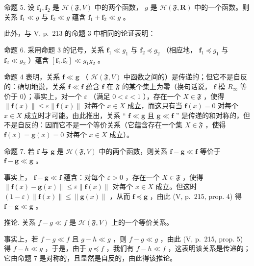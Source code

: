 命题 5. 设 \(\mathbf{f}_1, \mathbf{f}_2\) 是 \(\mathcal{H}(\mathfrak{F}, V)\) 中的两个函数， \(g\) 是 \(\mathcal{H}(\mathfrak{F}, \mathbf{R})\) 中的一个函数。则关系 \(\mathbf{f}_1 \ll g\) 与 \(\mathbf{f}_2 \ll g\) 蕴含 \(\mathbf{f}_1 + \mathbf{f}_2 \ll g\) 。

此外，与 V, p.~213 的命题 3 中相同的论证表明：

命题 6. 采用命题 3 的记号，关系 \(\mathbf{f}_1 \ll g_1\) 与 \(\mathbf{f}_2 \preccurlyeq g_2\) （相应地， \(\mathbf{f}_1 \preccurlyeq g_1\) 与 \(\mathbf{f}_2 \ll g_2\) ）蕴含 \([\mathbf{f}_1.\mathbf{f}_2] \ll g_1g_2\) 。

命题 4 表明，关系 \(\mathbf{f} \ll \mathbf{g}\) （ \(\mathcal{H}(\mathfrak{F}, V)\) 中函数之间的）是传递的；但它不是自反的：确切地说，关系 \(\mathbf{f} \ll \mathbf{f}\) 蕴含 \(\mathbf{f}\) 在 \(\mathfrak{F}\) 的某个集上为零（换句话说， \(\mathbf{f}\) 模 \(R_{\infty}\) 等价于 0）；事实上，对一个 \(\varepsilon\) （满足 \(0 < \varepsilon < 1\) ），存在一个 \(X \in \mathfrak{F}\) ，使得 \(\| \mathbf{f}(x) \| \leqslant \varepsilon \| \mathbf{f}(x) \|\) 对每个 \(x \in X\) 成立，而这只有当 \(\mathbf{f}(x) = 0\) 对每个 \(x \in X\) 成立时才可能。由此推出，关系 “ \(\mathbf{f} \ll \mathbf{g}\) 且 \(\mathbf{g} \ll \mathbf{f}\) ” 是传递的和对称的，但不是自反的：因而它不是一个等价关系（它蕴含存在一个集 \(X \in \mathfrak{F}\) ，使得 \(\mathbf{f}(x) = \mathbf{g}(x) = 0\) 对每个 \(x \in X\) 成立）。

命题 7. 若 \(\mathbf{f}\) 与 \(\mathbf{g}\) 是 \(\mathcal{H}(\mathfrak{F}, V)\) 中的两个函数，则关系 \(\mathbf{f} - \mathbf{g} \ll \mathbf{f}\) 等价于 \(\mathbf{f} - \mathbf{g} \ll \mathbf{g}\) 。

事实上， \(\mathbf{f} - \mathbf{g} \ll \mathbf{f}\) 蕴含：对每个 \(\varepsilon > 0\) ，存在一个 \(X \in \mathfrak{F}\) ，使得 \(\| \mathbf{f}(x) - \mathbf{g}(x) \| \leqslant \varepsilon \| \mathbf{f}(x) \|\) 对每个 \(x \in X\) 成立。但这时 \((1 - \varepsilon) \| \mathbf{f}(x) \| \leqslant \| \mathbf{g}(x) \|\) ，从而 \(\mathbf{f} \preccurlyeq \mathbf{g}\) ，由此 (V, p.~215, prop. 4) 得 \(\mathbf{f} - \mathbf{g} \ll \mathbf{g}\) 。

推论. 关系 \(f - g \ll f\) 是 \(\mathcal{H}(\mathfrak{F}, V)\) 上的一个等价关系。

事实上，若 \(f - g \ll f\) 且 \(g - h \ll g\) ，则 \(f - g \ll g\) ，由此 (V, p.~215, prop. 5) 得 \(f - h \ll g\) ，于是，由于 \(g \preccurlyeq f\) ，我们有 \(f - h \ll f\) ，这表明该关系是传递的；它由命题 7 是对称的，且显然是自反的，由此得该推论。

